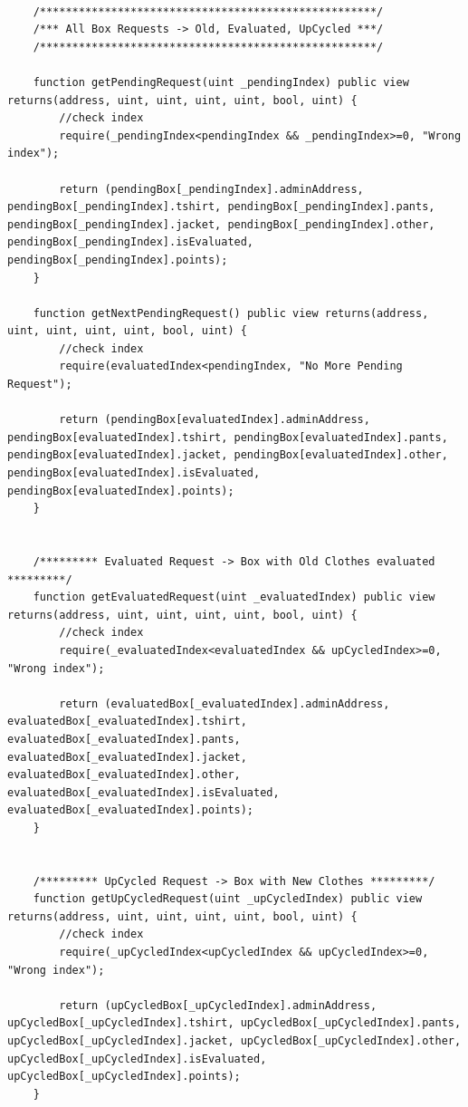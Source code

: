 \begin{lstlisting}[language=Solidity]
   
    /****************************************************/
    /*** All Box Requests -> Old, Evaluated, UpCycled ***/
    /****************************************************/

    function getPendingRequest(uint _pendingIndex) public view returns(address, uint, uint, uint, uint, bool, uint) {
        //check index
        require(_pendingIndex<pendingIndex && _pendingIndex>=0, "Wrong index");

        return (pendingBox[_pendingIndex].adminAddress, pendingBox[_pendingIndex].tshirt, pendingBox[_pendingIndex].pants, pendingBox[_pendingIndex].jacket, pendingBox[_pendingIndex].other, pendingBox[_pendingIndex].isEvaluated, pendingBox[_pendingIndex].points);
    }

    function getNextPendingRequest() public view returns(address, uint, uint, uint, uint, bool, uint) {
        //check index
        require(evaluatedIndex<pendingIndex, "No More Pending Request");

        return (pendingBox[evaluatedIndex].adminAddress, pendingBox[evaluatedIndex].tshirt, pendingBox[evaluatedIndex].pants, pendingBox[evaluatedIndex].jacket, pendingBox[evaluatedIndex].other, pendingBox[evaluatedIndex].isEvaluated, pendingBox[evaluatedIndex].points);
    }


    /********* Evaluated Request -> Box with Old Clothes evaluated *********/
    function getEvaluatedRequest(uint _evaluatedIndex) public view returns(address, uint, uint, uint, uint, bool, uint) {
        //check index
        require(_evaluatedIndex<evaluatedIndex && upCycledIndex>=0, "Wrong index");

        return (evaluatedBox[_evaluatedIndex].adminAddress, evaluatedBox[_evaluatedIndex].tshirt, evaluatedBox[_evaluatedIndex].pants, evaluatedBox[_evaluatedIndex].jacket, evaluatedBox[_evaluatedIndex].other, evaluatedBox[_evaluatedIndex].isEvaluated, evaluatedBox[_evaluatedIndex].points);
    }


    /********* UpCycled Request -> Box with New Clothes *********/
    function getUpCycledRequest(uint _upCycledIndex) public view returns(address, uint, uint, uint, uint, bool, uint) {
        //check index
        require(_upCycledIndex<upCycledIndex && upCycledIndex>=0, "Wrong index");

        return (upCycledBox[_upCycledIndex].adminAddress, upCycledBox[_upCycledIndex].tshirt, upCycledBox[_upCycledIndex].pants, upCycledBox[_upCycledIndex].jacket, upCycledBox[_upCycledIndex].other, upCycledBox[_upCycledIndex].isEvaluated, upCycledBox[_upCycledIndex].points);
    }


\end{lstlisting}
